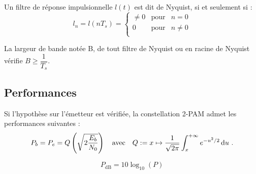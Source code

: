 	\begin{defn}
		Un filtre de réponse impulsionnelle $l(t)$ est dit de Nyquist, si et seulement si :
		$$l_{n} = l(nT_{s}) =
		\left\{ \begin{array}{rcr}
			\neq 0 & \text{pour} & n = 0 \\
			0      & \text{pour} & n \neq 0 \\
		\end{array} \right.$$
	\end{defn}
	
	\begin{pop}
		La largeur de bande notée B, de tout filtre de Nyquist ou en racine de Nyquist vérifie $B\geq \dfrac{1}{T_{s}}$.
	\end{pop}

\subsection{Performances}

	\begin{pop}
		Si l'hypothèse sur l'émetteur est vérifiée, la constellation 2-PAM admet les performances suivantes :
		$$P_b = P_e = Q \left( \sqrt{2 \frac{E_b}{N_0}} \right) \quad \text{avec} \quad Q := x \mapsto \frac{1}{\sqrt{2\pi}} \int_x^{+\infty} e^{-u^2/2} \mathop{}\mathopen{}\mathrm{d} u\ .$$
	\end{pop}
	
	$$P_\text{dB} = 10 \log_{10} (P)$$
	
	